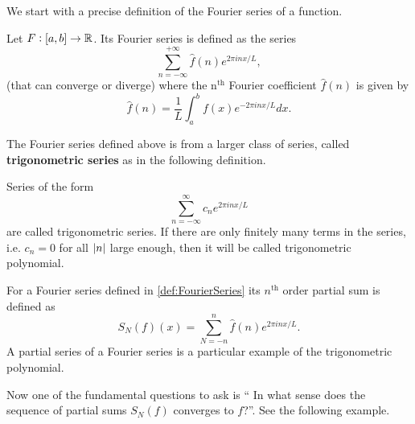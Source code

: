 We start with a precise definition of the Fourier series of a function.

\begin{definition}
	\label{def:FourierSeries}
	Let $ F:[a,b] \to \mathbb{R} $. Its Fourier series is defined as the series
	\[ \sum_{n=-\infty}^{+\infty} \hat{f}(n)e^{2\pi i n x / L} , \]
	(that can converge or diverge) where the $ \text{n}^\text{th} $ Fourier coefficient $ \hat{f}(n) $ is given by
	\[ \hat{f}(n) = \frac{1}{L} \int_{a}^{b} f(x) e^{-2\pi i n x/ L} dx.  \]
\end{definition} 

The Fourier series defined above is from a larger class of series, called \textbf{trigonometric series} as in the following definition.

\begin{definition}
	Series of the form
	\[ \sum_{n=-\infty}^{\infty} c_n e^{2\pi i n x / L} \]
	are called trigonometric series. If there are only finitely many terms in the series, i.e. $ c_n = 0 $ for all $ |n| $ large enough, then it will be called trigonometric polynomial.
\end{definition}

\begin{definition}
	For a Fourier series defined in \autoref{def:FourierSeries} its $ n^\text{th} $ order partial sum is defined as 
	\[ S_N(f)(x) = \sum_{N = -n}^{n} \hat{f}(n)e^{2\pi i n x/L}. \]
	A partial series of a Fourier series is a particular example of the trigonometric polynomial.
\end{definition}
Now one of the fundamental questions to ask is `` In what sense does the sequence of partial sums $ S_N(f) $ converges to $ f $?''. See the following example.


